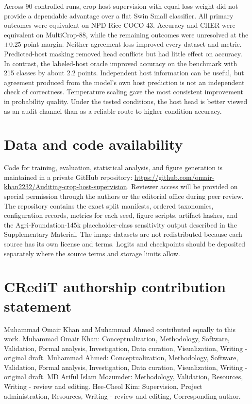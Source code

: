 \documentclass[preprint,12pt]{elsarticle}
\begin{document}
Across 90 controlled runs, crop host supervision with equal loss weight did not
provide a dependable advantage over a flat Swin Small classifier. All primary
outcomes were equivalent on NPD-Rice-COCO-43. Accuracy and CHER were equivalent
on MultiCrop-88, while the remaining outcomes were unresolved at the
$\pm0.25$ point margin. Neither agreement loss improved every dataset and
metric. Predicted-host masking removed head conflicts but had little effect on
accuracy. In contrast, the labeled-host oracle improved accuracy on the
benchmark with 215 classes by about 2.2 points. Independent host information can
be useful, but agreement produced from the model's own host prediction is not
an independent check of correctness. Temperature scaling gave the most
consistent improvement in probability quality. Under the tested conditions,
the host head is better viewed as an audit channel than as a reliable route to
higher condition accuracy.

\section*{Data and code availability}

Code for training, evaluation, statistical analysis, and figure generation is
maintained in a private GitHub repository:
\url{https://github.com/omair-khan2232/Auditing-crop-host-supervision}.
Reviewer access will be provided on special permission through the authors or
the editorial office during peer review. The repository contains the exact
split manifests, ordered taxonomies, configuration records, metrics for each
seed, figure scripts, artifact hashes, and the Agri-Foundation-145k
placeholder-class sensitivity output described in the Supplementary Material.
The image datasets are not redistributed because each source has its own
license and terms. Logits and checkpoints should be deposited separately where
the source terms and storage limits allow.

\section*{CRediT authorship contribution statement}

Muhammad Omair Khan and Muhammad Ahmed contributed equally to this work.
Muhammad Omair Khan: Conceptualization, Methodology, Software, Validation,
Formal analysis, Investigation, Data curation, Visualization, Writing - original
draft. Muhammad Ahmed: Conceptualization, Methodology, Software, Validation,
Formal analysis, Investigation, Data curation, Visualization, Writing - original
draft. MD Ariful Islam Mozumder: Methodology, Validation, Resources, Writing -
review and editing. Hee-Cheol Kim: Supervision, Project administration,
Resources, Writing - review and editing, Corresponding author.
\end{document}
